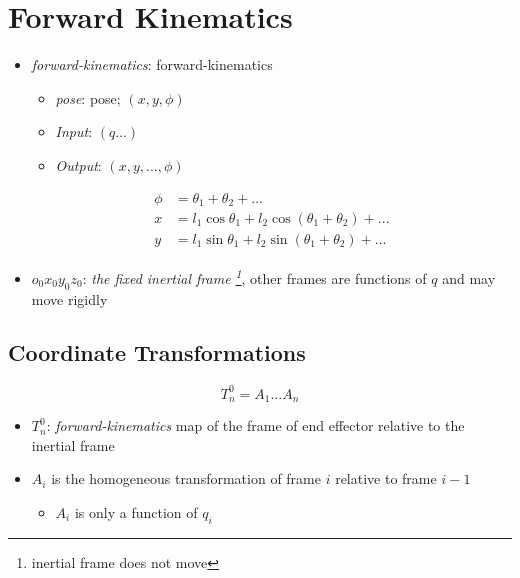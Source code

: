 \chapter{Forward Kinematics}

\begin{itemize}
  \item \emph{\Gls{forward-kinematics}}: \glsdesc{forward-kinematics}
  \begin{itemize}
    \item \emph{\Gls{pose}}: \glsdesc{pose}; $ \left( x, y, \phi \right) $
    \item \emph{Input}: $ \left( q... \right) $
    \item \emph{Output}: $ \left( x, y, ..., \phi \right) $
  \end{itemize}

  \begin{align}
    \phi &= \theta_{1} + \theta_{2} + ... \\
    x &= l_{1} \cos \theta_{1} + l_{2} \cos \left( \theta_{1} + \theta_{2} \right) + ... \\
    y &= l_{1} \sin \theta_{1} + l_{2} \sin \left( \theta_{1} + \theta_{2} \right) + ...
  \end{align}

  \item $ o_{0} x_{0} y_{0} z_{0} $: \emph{the fixed inertial frame
  \footnote{inertial frame does not move}}, other frames are functions of
  $ q $ and may move rigidly
\end{itemize}

\section{Coordinate Transformations}

  \begin{equation}
    T^{0}_{n} = A_{1} ... A_{n}
  \end{equation}

  \begin{itemize}
    \item $ T^{0}_{n} $: \emph{\gls{forward-kinematics}} map of the frame of
    end effector relative to the inertial frame
    \item $ A_{i} $ is the homogeneous transformation of frame $ i $ relative to
    frame $ i - 1 $
    \begin{itemize}
      \item $ A_{i} $ is only a function of $ q_{i} $
    \end{itemize}
  \end{itemize}

